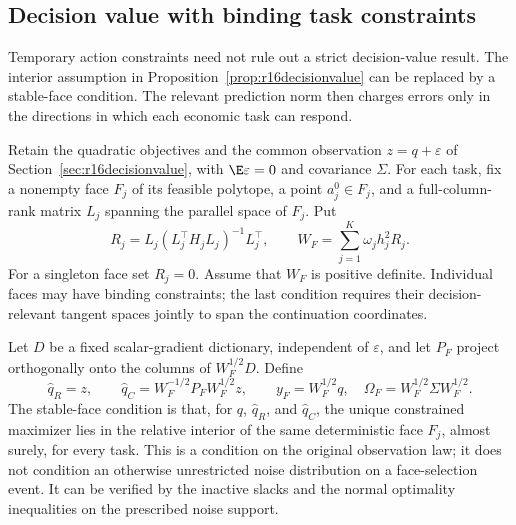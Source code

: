 \subsection{Decision value with binding task constraints}
\label{sec:r16activefacevalue}
Temporary action constraints need not rule out a strict decision-value result. The interior assumption in Proposition~\ref{prop:r16decisionvalue} can be replaced by a stable-face condition. The relevant prediction norm then charges errors only in the directions in which each economic task can respond.

Retain the quadratic objectives and the common observation $z=q+\varepsilon$ of Section~\ref{sec:r16decisionvalue}, with $\E\varepsilon=0$ and covariance $\Sigma$. For each task, fix a nonempty face $F_j$ of its feasible polytope, a point $a_j^0\in F_j$, and a full-column-rank matrix $L_j$ spanning the parallel space of $F_j$. Put
\[
 R_j=L_j(L_j^\top H_jL_j)^{-1}L_j^\top,
 \qquad W_F=\sum_{j=1}^K\omega_jh_j^2R_j.
\]
For a singleton face set $R_j=0$. Assume that $W_F$ is positive definite. Individual faces may have binding constraints; the last condition requires their decision-relevant tangent spaces jointly to span the continuation coordinates.

Let $D$ be a fixed scalar-gradient dictionary, independent of $\varepsilon$, and let $P_F$ project orthogonally onto the columns of $W_F^{1/2}D$. Define
\[
 \widehat q_R=z,\qquad
 \widehat q_C=W_F^{-1/2}P_FW_F^{1/2}z,
 \qquad y_F=W_F^{1/2}q,
 \quad\Omega_F=W_F^{1/2}\Sigma W_F^{1/2}.
\]
The stable-face condition is that, for $q$, $\widehat q_R$, and $\widehat q_C$, the unique constrained maximizer lies in the relative interior of the same deterministic face $F_j$, almost surely, for every task. This is a condition on the original observation law; it does not condition an otherwise unrestricted noise distribution on a face-selection event. It can be verified by the inactive slacks and the normal optimality inequalities on the prescribed noise support.

